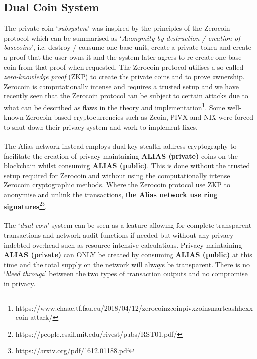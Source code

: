 \subsection{Dual Coin System}
The private coin ‘\textit{subsystem}’ was inspired by the principles of the Zerocoin
protocol which can be summarised as ‘\textit{Anonymity by destruction / creation of
basecoins}’, i.e. destroy / consume one base unit, create a private token
and create a proof that the user owns it and the system later agrees to
re-create one base coin from that proof when requested. The Zerocoin protocol
utilises a so called \textit{zero-knowledge proof} (ZKP) to create the private coins
and to prove ownership. Zerocoin is computationally intense and requires a
trusted setup and we have recently seen that the Zerocoin protocol can be
subject to certain attacks due to what can be described as flaws in the
theory and 
implementation\footnote{https://www.chaac.tf.fau.eu/2018/04/12/zerocoinzcoinpivxzoinsmartcashhexxcoin-attack/}. 
Some well-known Zerocoin based cryptocurrencies
such as Zcoin, PIVX and NIX were forced to shut down their privacy system and
work to implement fixes.
\\
\\
\noindent
The Alias network instead employs dual-key stealth address cryptography
to facilitate the creation of privacy maintaining \textbf{ALIAS (private)} coins on the
blockchain whilst consuming \textbf{ALIAS (public)}. This is done without the trusted setup
required for Zerocoin and without using the computationally intense Zerocoin
cryptographic methods. Where the Zerocoin protocol use ZKP to anonymise and
unlink the transactions, 
\textbf{the Alias network use ring signatures}\footnote{https://people.csail.mit.edu/rivest/pubs/RST01.pdf/}\footnote{https://arxiv.org/pdf/1612.01188.pdf}.
\\
\\
\noindent
The ‘\textit{dual-coin}’ system can be seen as a feature allowing for complete
transparent transactions and network audit functions if needed but
without any privacy indebted overhead such as resource intensive
calculations. Privacy maintaining \textbf{ALIAS (private)} can ONLY be created by
consuming \textbf{ALIAS (public)} at this time and the total supply on the network
will always be transparent. There is no ‘\textit{bleed through}’ between the
two types of transaction outputs and no compromise in privacy.
\newpage


